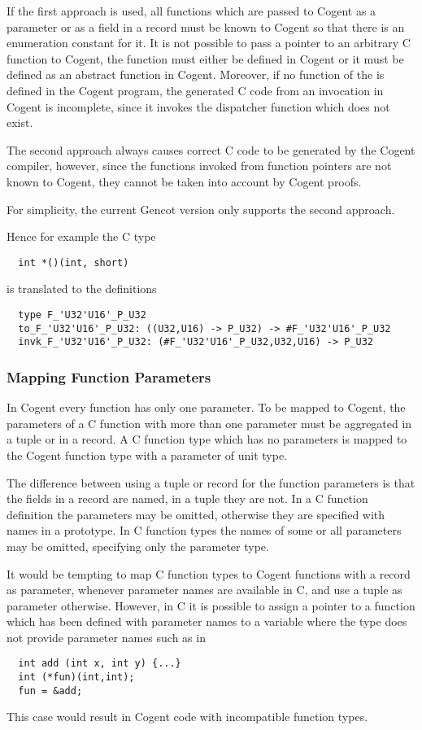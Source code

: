 If the first approach is used, all functions which are passed to Cogent as a parameter or as a field in a record must be known to
Cogent so that there is an enumeration constant for it. It is not possible to pass a pointer to an arbitrary 
C function to Cogent, the function must either be defined in Cogent or it must be defined as an abstract function 
in Cogent. Moreover, if no function of the  is defined in the Cogent program, the
generated C code from an invocation in Cogent is incomplete, since it invokes the dispatcher function which does
not exist.

The second approach always causes correct C code to be generated by the Cogent compiler, however, since the functions
invoked from function pointers are not known to Cogent, they cannot be taken into account by Cogent proofs.

For simplicity, the current Gencot version only supports the second approach.

Hence for example the C type
\begin{verbatim}
  int *()(int, short)
\end{verbatim}
is translated to the definitions
\begin{verbatim}
  type F_'U32'U16'_P_U32
  to_F_'U32'U16'_P_U32: ((U32,U16) -> P_U32) -> #F_'U32'U16'_P_U32
  invk_F_'U32'U16'_P_U32: (#F_'U32'U16'_P_U32,U32,U16) -> P_U32
\end{verbatim}

\subsubsection{Mapping Function Parameters}

In Cogent every function
has only one parameter. To be mapped to Cogent, the parameters of a C function with more than one parameter must
be aggregated in a tuple or in a record. A C function type  which has no parameters is mapped
to the Cogent function type  with a parameter of unit type.

The difference between using a tuple or record for the function parameters is that the fields in a 
record are named, in a tuple they are not. In 
a C function definition the parameters may be omitted, otherwise they are specified with names in a prototype.
In C function types the names of some or all parameters may be omitted, specifying only the parameter type.

It would be tempting to map C function types to Cogent functions with a record as parameter, whenever parameter 
names are available in C, and use a tuple as parameter otherwise. However, in C it is possible to assign a 
pointer to a function which has been defined 
with parameter names to a variable where the type does not provide parameter names such as in 
\begin{verbatim}
  int add (int x, int y) {...}
  int (*fun)(int,int);
  fun = &add;
\end{verbatim}
This case would result in Cogent code with incompatible function types.

